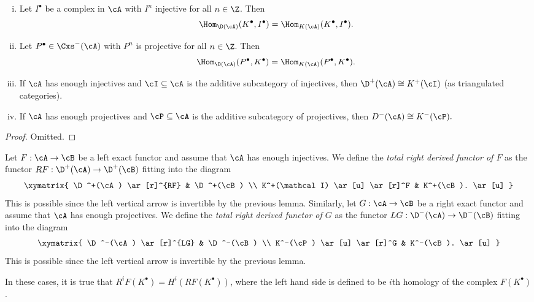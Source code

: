 \begin{lem}
\begin{enumerate}[i.]
\item 
Let $I^\bullet$ be a complex in $\cA$ with $I^n$ injective for all $n \in \Z$. Then 
$$
\Hom_{\D(\cA)}(K^\bullet, I^\bullet) 
= 
\Hom_{K(\cA)}(K^\bullet, I^\bullet).
$$
\item 
Let $P^\bullet \in \Cxs^-(\cA)$ with $P^n$ is projective for all $n \in \Z$. Then 
$$
\Hom_{\D(\cA)}(P^\bullet, K^\bullet) 
= 
\Hom_{K(\cA)}(P^\bullet, K^\bullet).
$$
\item 
If $\cA$ has enough injectives and $\cI \subseteq \cA$ is the additive subcategory of injectives, then
$
\D^+(\cA)\cong K^+(\cI)
$
(as triangulated categories).
\item 
If $\cA$ has enough projectives and $\cP \subseteq \cA$ is the additive subcategory of projectives, then 
$
D^-(\cA) \cong K^-(\cP).
$
\end{enumerate}
\end{lem}

\begin{proof}
  Omitted.
\end{proof}

\begin{defi}
Let $F: \cA \to \cB$ be a left exact functor and assume that $\cA$ has enough injectives. We define the \emph{total right derived functor of $F$} as  the functor $RF: \D^+(\cA) \to \D^+(\cB)$ fitting into the diagram
$$
\xymatrix{ 
\D^+(\cA) \ar[r]^{RF} & \D^+(\cB) \\
K^+(\mathcal I) \ar[u] \ar[r]^F & K^+(\cB). \ar[u]
}
$$
This is possible since the left vertical arrow is invertible by the previous lemma.  Similarly, let $G: \cA \to \cB$ be a right exact functor and assume that $\cA$ has enough projectives. We define the \emph{total right derived functor of $G$} as  the functor $LG: \D^-(\cA) \to \D^-(\cB)$ fitting into the diagram 
$$
\xymatrix{ 
\D^-(\cA) \ar[r]^{LG} & \D^-(\cB) \\
K^-(\cP) \ar[u] \ar[r]^G & K^-(\cB). \ar[u]
}
$$
This is possible since the left vertical arrow is invertible by the previous lemma.
\end{defi}

\begin{remark} 
In these cases, it is true that $R^iF(K^\bullet) = H^i(RF(K^\bullet))$, where the left hand side is defined to be $i$th homology of the complex $F(K^\bullet)$.  
\end{remark}

